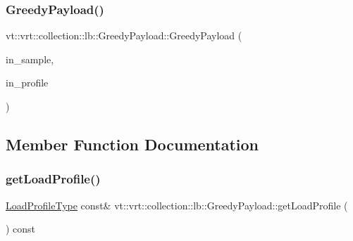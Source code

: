 \subsubsection{\texorpdfstring{Greedy\+Payload()}{GreedyPayload()}\hspace{0.1cm}{\footnotesize\ttfamily [2/2]}}
{\footnotesize\ttfamily vt\+::vrt\+::collection\+::lb\+::\+Greedy\+Payload\+::\+Greedy\+Payload (\begin{DoxyParamCaption}\item[{\hyperlink{structvt_1_1vrt_1_1collection_1_1lb_1_1_greedy_l_b_types_a467f8a79d0785fca5fc95bd5c0f406b9}{Obj\+Sample\+Type} const \&}]{in\+\_\+sample,  }\item[{\hyperlink{structvt_1_1vrt_1_1collection_1_1lb_1_1_greedy_l_b_types_a9fe8829bc0c92e88ddf9d149233a54f4}{Load\+Type} const \&}]{in\+\_\+profile }\end{DoxyParamCaption})\hspace{0.3cm}{\ttfamily [inline]}}



\subsection{Member Function Documentation}
\mbox{\label{structvt_1_1vrt_1_1collection_1_1lb_1_1_greedy_payload_a9c4cc1760d2a176ea190cd055b121ec2}} 
\subsubsection{\texorpdfstring{get\+Load\+Profile()}{getLoadProfile()}}
{\footnotesize\ttfamily \hyperlink{structvt_1_1vrt_1_1collection_1_1lb_1_1_greedy_l_b_types_a8af324cd88e83727178631e4d1478932}{Load\+Profile\+Type} const\& vt\+::vrt\+::collection\+::lb\+::\+Greedy\+Payload\+::get\+Load\+Profile (\begin{DoxyParamCaption}{ }\end{DoxyParamCaption}) const\hspace{0.3cm}{\ttfamily [inline]}}

\mbox{\label{structvt_1_1vrt_1_1collection_1_1lb_1_1_greedy_payload_a2f16402fb9c14fb36a378985919b35f0}} 
